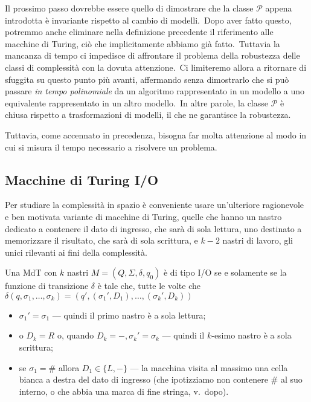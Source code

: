 \noindent Il prossimo passo dovrebbe essere quello di dimostrare che la classe $\mathcal{P}$ appena introdotta è invariante rispetto al cambio di modelli.\
Dopo aver fatto questo, potremmo anche eliminare nella definizione precedente il riferimento alle macchine di Turing, ciò che implicitamente abbiamo già fatto.\
Tuttavia la mancanza di tempo ci impedisce di affrontare il problema della robustezza delle classi di complessità con la dovuta attenzione.\
Ci limiteremo allora a ritornare di sfuggita su questo punto più avanti, affermando senza dimostrarlo che si può passare \textit{in tempo polinomiale} da un algoritmo rappresentato in un modello a uno equivalente rappresentato in un altro modello.\
In altre parole, la classe $\mathcal{P}$ è chiusa rispetto a trasformazioni di modelli, il che ne garantisce la robustezza.\

Tuttavia, come accennato in precedenza, bisogna far molta attenzione al modo in cui si misura il tempo necessario a risolvere un problema.

\subsection{Macchine di Turing I/O}

Per studiare la complessità in spazio è conveniente usare un'ulteriore ragionevole e ben motivata variante di macchine di Turing, quelle che hanno un nastro dedicato a contenere il dato di ingresso, che sarà di sola lettura, uno destinato a memorizzare il risultato, che sarà di sola scrittura, e $k - 2$ nastri di lavoro, gli unici rilevanti ai fini della complessità.\

\begin{definition}
    \label{MdT_I/O}
    Una MdT con $k$ nastri $M= (Q,\Sigma, \delta, q_0)$ è di tipo I/O se e solamente se la funzione di transizione $\delta$ è tale che, tutte le volte che $\delta(q, \sigma_1, \dots, \sigma_k) = (q', (\sigma_1', D_1), \dots, (\sigma_k', D_k))$
    \begin{itemize}
        \item $\sigma_1'=\sigma_1$ --- quindi il primo nastro è a sola lettura;
        \item o $D_k = R$ o, quando $D_k = -, \sigma_k' = \sigma_k$ --- quindi il $k$-esimo nastro è a sola scrittura;
        \item se $\sigma_1 = \#$ allora $D_1 \in \{L,-\}$ --- la macchina visita al massimo una cella bianca a destra del dato di ingresso (che ipotizziamo non contenere \# al suo interno, o che abbia una marca di fine stringa, v.\ dopo).
    \end{itemize}
\end{definition}

